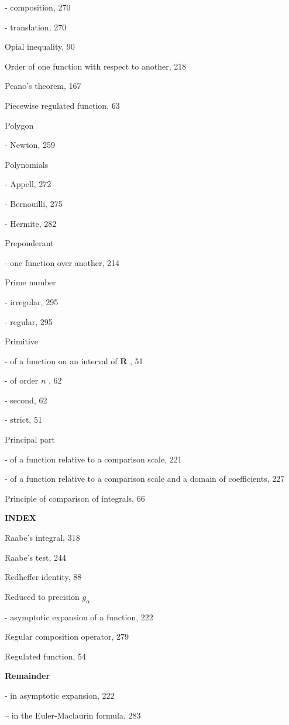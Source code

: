- composition, 270

- translation, 270

Opial inequality, 90

Order of one function with respect to another, 218

Peano's theorem, 167

Piecewise regulated function, 63

Polygon

- Newton, 259

Polynomials

- Appell, 272

- Bernouilli, 275

- Hermite, 282

Preponderant

- one function over another, 214

Prime number

- irregular, 295

- regular, 295

Primitive

- of a function on an interval of \(\mathbf{R}\) , 51

- of order \(n\) , 62

- second, 62

- strict, 51

Principal part

- of a function relative to a comparison scale, 221

- of a function relative to a comparison scale and a domain of coefficients, 227

Principle of comparison of integrals, 66

\par\noindent\textbf{INDEX}\par

Raabe's integral, 318

Raabe's test, 244

Redheffer identity, 88

Reduced to precision \(g_{\alpha}\)

- asymptotic expansion of a function, 222

Regular composition operator, 279

Regulated function, 54

\par\noindent\textbf{Remainder}\par

- in asymptotic expansion, 222

-- in the Euler-Maclaurin formula, 283


